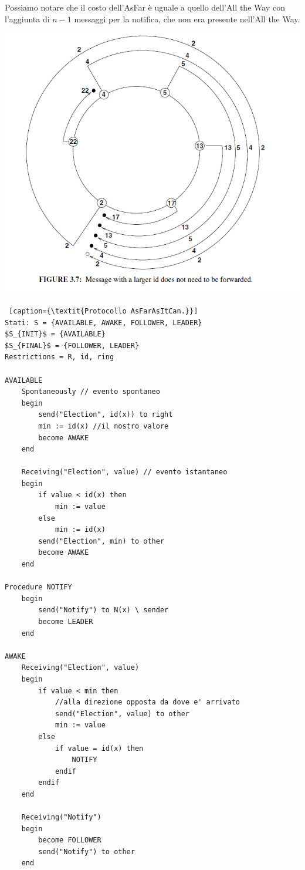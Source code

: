 Possiamo notare che il costo dell'AsFar è uguale a quello dell'All the Way con
l'aggiunta di $n-1$ messaggi per la notifica, che non era presente nell'All the
Way.

\begin{center}
    \includegraphics[scale=0.5]{capitoli/leader-election/imgs/asFar.png}
\end{center}

\newpage
\begin{lstlisting} [caption={\textit{Protocollo AsFarAsItCan.}}]
Stati: S = {AVAILABLE, AWAKE, FOLLOWER, LEADER}
$S_{INIT}$ = {AVAILABLE}
$S_{FINAL}$ = {FOLLOWER, LEADER}
Restrictions = R, id, ring

AVAILABLE
    Spontaneously // evento spontaneo
    begin
        send("Election", id(x)) to right
        min := id(x) //il nostro valore
        become AWAKE
    end
    
    Receiving("Election", value) // evento istantaneo
    begin
        if value < id(x) then
            min := value
        else
            min := id(x)
        send("Election", min) to other
        become AWAKE
    end

Procedure NOTIFY
    begin
        send("Notify") to N(x) \ sender
        become LEADER
    end

AWAKE
    Receiving("Election", value)
    begin
        if value < min then
            //alla direzione opposta da dove e' arrivato
            send("Election", value) to other 
            min := value
        else
            if value = id(x) then 
                NOTIFY
            endif
        endif
    end
    
    Receiving("Notify")
    begin
        become FOLLOWER
        send("Notify") to other
    end
\end{lstlisting}

